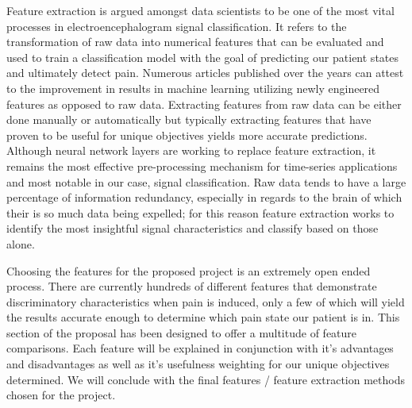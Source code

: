 \documentclass[12pt]{article}
\begin{document}
Feature extraction is argued amongst data scientists to be one of the most vital processes in electroencephalogram signal classification. It refers to the transformation of raw data into numerical features that can be evaluated and used to train a classification model with the goal of predicting our patient states and ultimately detect pain. Numerous articles published over the years can attest to the improvement in results in machine learning utilizing newly engineered features as opposed to raw data. Extracting features from raw data can be either done manually or automatically but typically extracting features that have proven to be useful for unique objectives yields more accurate predictions. Although neural network layers are working to replace feature extraction, it remains the most effective pre-processing mechanism for time-series applications and most notable in our case, signal classification. Raw data tends to have a large percentage of information redundancy, especially in regards to the brain of which their is so much data being expelled; for this reason feature extraction works to identify the most insightful signal characteristics and classify based on those alone.

Choosing the features for the proposed project is an extremely open ended process. There are currently hundreds of different features that demonstrate discriminatory characteristics when pain is induced, only a few of which will yield the results accurate enough to determine which pain state our patient is in. This section of the proposal has been designed to offer a multitude of feature comparisons. Each feature will be explained in conjunction with it's advantages and disadvantages as well as it's usefulness weighting for our unique objectives determined. We will conclude with the final features / feature extraction methods chosen for the project. 
\end{document}
